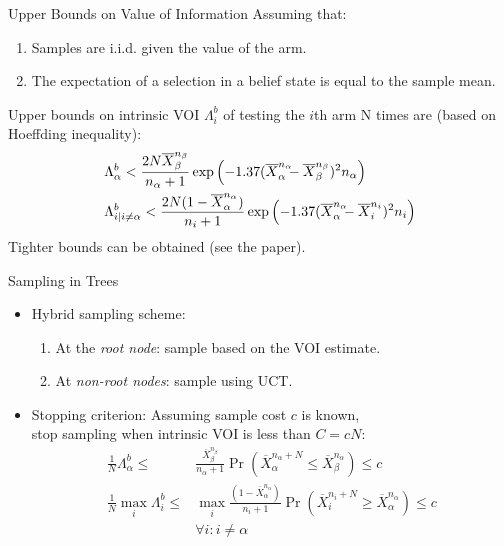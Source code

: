 \documentclass{beamer}
\title{}
\author{}
\institute{}
\date{}
\begin{document}

\begin{frame}{Upper Bounds on Value of Information}
Assuming that:
\begin{enumerate}
\item Samples are i.i.d. given the value of the arm.
\item The expectation of a selection in a belief state is equal to the sample mean.
\end{enumerate}
Upper bounds on intrinsic VOI $\Lambda^b_i$ of testing the $i$th arm N
times are (based on Hoeffding inequality):
\begin{align*}
  \Lambda&_\alpha^b < \frac {2N\overline X_\beta^{n_\beta}} {n_\alpha+1}\exp\left(- 1.37(\overline X_\alpha^{n_\alpha}\hspace{-0.5em} - \overline X_\beta^{n_\beta})^2 n_\alpha\right)\\
  \Lambda&_{i|i\ne\alpha}^b <  \frac {2N(1-\overline  X_\alpha^{n_\alpha})} {n_i+1}\exp\left(- 1.37(\overline X_\alpha^{n_\alpha}\hspace{-0.5em} - \overline X_i^{n_i})^2 n_i\right)
\end{align*}
Tighter bounds can be obtained (see the paper).

\end{frame}

\begin{frame}{Sampling in Trees}
\begin{itemize}
\item Hybrid sampling scheme:
\begin{enumerate}
\item At the {\it root node}: sample based on the VOI estimate.
\item At {\it non-root nodes}: sample using UCT.
\end{enumerate}
\item Stopping criterion: Assuming sample cost $c$ is known,\\
\hspace{1em}stop sampling when intrinsic VOI is less than $C=cN$:
\begin{align*}
\frac 1 N \Lambda_\alpha^b \le&\frac {\overline X_\beta^{n_\beta}}
  {n_\alpha+1}\Pr(\overline X_\alpha^{n_\alpha+N}\le\overline
  X_\beta^{n_\alpha})\le c\\
\frac 1 N \max_i\Lambda_i^b\le &\max_i\frac {(1-\overline X_\alpha^{n_\alpha})} {n_i+1}\Pr(\overline
  X_i^{n_i+N}\ge\overline X_\alpha^{n_\alpha})\le c\\
    &\forall i: i\ne\alpha
\end{align*}
\end{itemize}
\end{frame}
\end{document}
